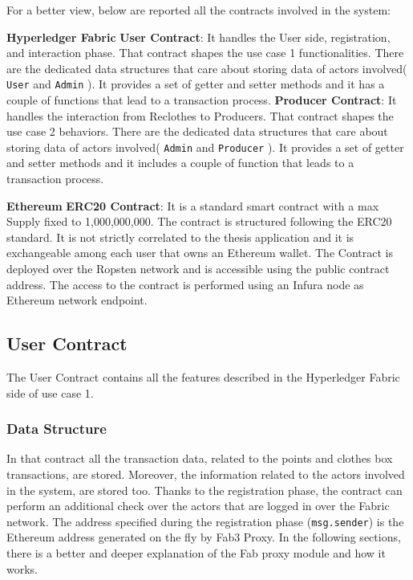 For a better view, below are reported all the contracts involved in the system:
\begin{outline}[enumerate]
    \1 \textbf{Hyperledger Fabric}
    \2 \textbf{User Contract}: It handles the User side, registration, and interaction phase. That contract shapes 
    the use case 1 functionalities. There are the dedicated data structures that care about storing data of actors 
    involved( \texttt{User} and \texttt{Admin} ). It provides a set of getter and setter methods and it has a couple 
    of functions that lead to a transaction process.    
    \2 \textbf{Producer Contract}: It handles the interaction from Reclothes to Producers. That contract shapes the 
    use case 2 behaviors. There are the dedicated data structures that care about storing data of actors  
    involved( \texttt{Admin} and \texttt{Producer} ). It provides a set of getter and setter methods and it includes 
    a couple of function that leads to a transaction process.  

    \1 \textbf{Ethereum}
    \2 \textbf{ERC20 Contract}: It is a standard smart contract with a max Supply fixed to 1,000,000,000.
    The contract is structured following the ERC20 standard. It is not strictly correlated to the thesis application and
    it is exchangeable among each user that owns an Ethereum wallet. The Contract is deployed over the Ropsten network 
    and is accessible using the public contract address. The access to the contract is performed using an Infura node 
    as Ethereum network endpoint.
\end{outline}

\subsection{User Contract} 

The User Contract contains all the features described in the Hyperledger Fabric side of use case 1. 

\subsubsection{Data Structure}

In that contract all the transaction data, related to the points and clothes box transactions, are stored. Moreover, 
the information related to the actors involved in the system, are stored too. 
Thanks to the registration phase, the contract can perform an additional check over the actors that are logged in 
over the Fabric network. The address specified during the registration phase (\texttt{msg.sender}) is the Ethereum 
address generated on the fly by Fab3 Proxy. In the following sections, there is a better and deeper explanation of 
the Fab proxy module and how it works.  
\bigskip

